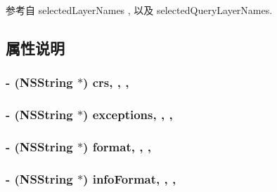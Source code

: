 参考自 selected\-Layer\-Names , 以及 selected\-Query\-Layer\-Names.



\subsection{属性说明}
\hypertarget{interface_r_m_w_m_s_a5de5fd2cc45d3d5619240b5002c57780}{
\subsubsection[{crs}]{\setlength{\rightskip}{0pt plus 5cm}-\/ (N\-S\-String $\ast$) crs\hspace{0.3cm}{\ttfamily [read]}, {\ttfamily [write]}, {\ttfamily [atomic]}, {\ttfamily [retain]}}}\label{interface_r_m_w_m_s_a5de5fd2cc45d3d5619240b5002c57780}
\hypertarget{interface_r_m_w_m_s_aa64c9b69921dd1b5f81e81d3c779c9c3}{
\subsubsection[{exceptions}]{\setlength{\rightskip}{0pt plus 5cm}-\/ (N\-S\-String $\ast$) exceptions\hspace{0.3cm}{\ttfamily [read]}, {\ttfamily [write]}, {\ttfamily [atomic]}, {\ttfamily [retain]}}}\label{interface_r_m_w_m_s_aa64c9b69921dd1b5f81e81d3c779c9c3}
\hypertarget{interface_r_m_w_m_s_a27cb6fed7d8d9a4f1b97f0ca7ae6a9cc}{
\subsubsection[{format}]{\setlength{\rightskip}{0pt plus 5cm}-\/ (N\-S\-String $\ast$) format\hspace{0.3cm}{\ttfamily [read]}, {\ttfamily [write]}, {\ttfamily [atomic]}, {\ttfamily [retain]}}}\label{interface_r_m_w_m_s_a27cb6fed7d8d9a4f1b97f0ca7ae6a9cc}
\hypertarget{interface_r_m_w_m_s_ac0a197d34cda3319ff17b255c8ee38a6}{
\subsubsection[{info\-Format}]{\setlength{\rightskip}{0pt plus 5cm}-\/ (N\-S\-String $\ast$) info\-Format\hspace{0.3cm}{\ttfamily [read]}, {\ttfamily [write]}, {\ttfamily [atomic]}, {\ttfamily [retain]}}}\label{interface_r_m_w_m_s_ac0a197d34cda3319ff17b255c8ee38a6}
